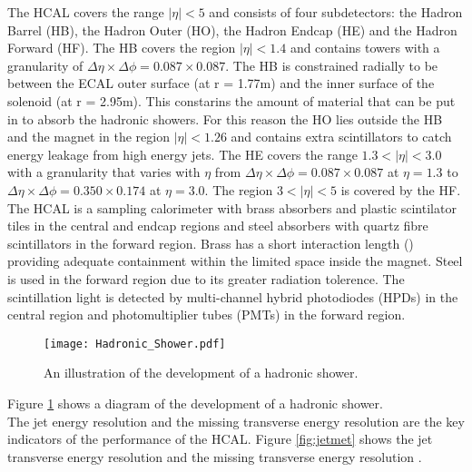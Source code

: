 The HCAL covers the range $|\eta| < 5$ and consists of four subdetectors: the
Hadron Barrel (HB), the Hadron Outer (HO), the Hadron Endcap (HE) and the Hadron
Forward (HF). The HB covers the region $|\eta| < 1.4$ and contains towers with a 
granularity of $\Delta\eta\times\Delta\phi = 0.087\times0.087$. The HB is 
constrained radially to be between the ECAL outer surface (at r = 1.77m) and the
inner surface of the solenoid (at r = 2.95m). This constarins the amount of 
material that can be put in to absorb the hadronic showers. For this reason the 
HO lies outside the HB and the magnet in the region $|\eta| < 1.26$ and contains
extra scintillators to catch energy leakage from high energy jets. The HE covers
the range $1.3 < |\eta| < 3.0$ with a granularity that varies with $\eta$ from 
$\Delta\eta\times\Delta\phi = 0.087\times0.087$ at $\eta = 1.3$ to 
$\Delta\eta\times\Delta\phi = 0.350\times0.174$ at $\eta = 3.0$. The region $3 <
 |\eta| < 5$ is covered by the HF. \\

The HCAL is a sampling calorimeter with brass absorbers and plastic scintilator
tiles in the central and endcap regions and steel absorbers with quartz fibre 
scintillators in the forward region. Brass has a short interaction length () 
providing adequate containment within the limited space inside the magnet. Steel 
is used in the forward region due to its greater radiation tolerence. The 
scintillation light is detected by multi-channel hybrid photodiodes (HPDs) in 
the central region and photomultiplier tubes (PMTs) in the forward region. \\

\begin{figure}
\begin{center}
\texttt{[image: Hadronic\_Shower.pdf]}
\end{center}
\caption{An illustration of the development of a hadronic shower.}
\label{fig:hadronic_shower}
\end{figure}

Figure \ref{fig:hadronic_shower} shows a diagram of the development of a
hadronic shower. \\

The jet energy resolution and the missing transverse energy resolution are the 
key indicators of the performance of the HCAL. Figure \ref{fig:jetmet} shows the
jet transverse energy resolution and the missing transverse energy resolution
\cite{jet_resolution, met_resolution}.

